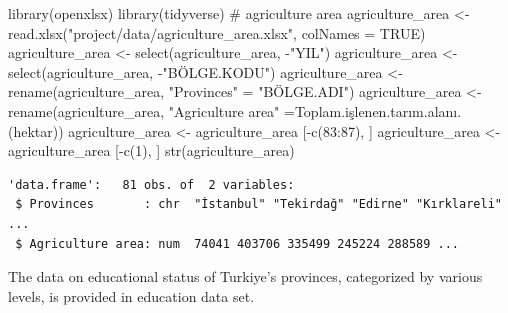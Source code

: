\documentclass[
  11pt,
  a4paper,
  DIV=11,
  numbers=noendperiod]{scrartcl}
\newenvironment{Shaded}{\begin{snugshade}}{\end{snugshade}}
\newcommand{\AttributeTok}[1]{\textcolor[rgb]{0.40,0.45,0.13}{#1}}
\newcommand{\CommentTok}[1]{\textcolor[rgb]{0.37,0.37,0.37}{#1}}
\newcommand{\ConstantTok}[1]{\textcolor[rgb]{0.56,0.35,0.01}{#1}}
\newcommand{\DecValTok}[1]{\textcolor[rgb]{0.68,0.00,0.00}{#1}}
\newcommand{\FunctionTok}[1]{\textcolor[rgb]{0.28,0.35,0.67}{#1}}
\newcommand{\NormalTok}[1]{\textcolor[rgb]{0.00,0.23,0.31}{#1}}
\newcommand{\OtherTok}[1]{\textcolor[rgb]{0.00,0.23,0.31}{#1}}
\newcommand{\SpecialCharTok}[1]{\textcolor[rgb]{0.37,0.37,0.37}{#1}}
\newcommand{\StringTok}[1]{\textcolor[rgb]{0.13,0.47,0.30}{#1}}
\begin{document}
\begin{Shaded}
\begin{Highlighting}[]
\FunctionTok{library}\NormalTok{(openxlsx)}
\FunctionTok{library}\NormalTok{(tidyverse)}
\CommentTok{\# agriculture area}
\NormalTok{agriculture\_area }\OtherTok{\textless{}{-}} \FunctionTok{read.xlsx}\NormalTok{(}\StringTok{"project/data/agriculture\_area.xlsx"}\NormalTok{, }\AttributeTok{colNames =} \ConstantTok{TRUE}\NormalTok{)}
\NormalTok{agriculture\_area }\OtherTok{\textless{}{-}} \FunctionTok{select}\NormalTok{(agriculture\_area, }\SpecialCharTok{{-}}\StringTok{"YIL"}\NormalTok{)  }
\NormalTok{agriculture\_area }\OtherTok{\textless{}{-}} \FunctionTok{select}\NormalTok{(agriculture\_area, }\SpecialCharTok{{-}}\StringTok{"BÖLGE.KODU"}\NormalTok{)  }
\NormalTok{agriculture\_area }\OtherTok{\textless{}{-}} \FunctionTok{rename}\NormalTok{(agriculture\_area, }\StringTok{"Provinces"} \OtherTok{=} \StringTok{"BÖLGE.ADI"}\NormalTok{)}
\NormalTok{agriculture\_area }\OtherTok{\textless{}{-}} \FunctionTok{rename}\NormalTok{(agriculture\_area, }\StringTok{"Agriculture area"} \OtherTok{=}\StringTok{\textasciigrave{}}\AttributeTok{Toplam.işlenen.tarım.alanı.(hektar)}\StringTok{\textasciigrave{}}\NormalTok{)}
\NormalTok{agriculture\_area }\OtherTok{\textless{}{-}}\NormalTok{ agriculture\_area [}\SpecialCharTok{{-}}\FunctionTok{c}\NormalTok{(}\DecValTok{83}\SpecialCharTok{:}\DecValTok{87}\NormalTok{), ]}
\NormalTok{agriculture\_area }\OtherTok{\textless{}{-}}\NormalTok{ agriculture\_area [}\SpecialCharTok{{-}}\FunctionTok{c}\NormalTok{(}\DecValTok{1}\NormalTok{), ]}
\FunctionTok{str}\NormalTok{(agriculture\_area)}
\end{Highlighting}
\end{Shaded}

\begin{verbatim}
'data.frame':   81 obs. of  2 variables:
 $ Provinces       : chr  "İstanbul" "Tekirdağ" "Edirne" "Kırklareli" ...
 $ Agriculture area: num  74041 403706 335499 245224 288589 ...
\end{verbatim}

The data on {educational status} of Turkiye's provinces, categorized by
various levels, is provided in education data set.
\end{document}
